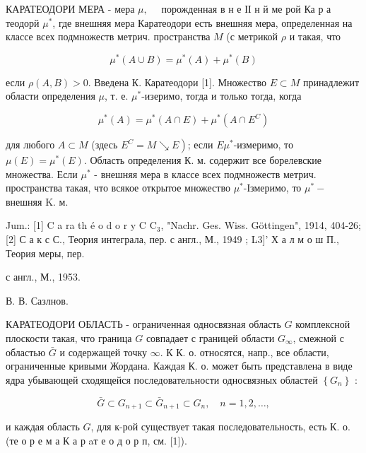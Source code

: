 \documentclass[10pt]{article}
\begin{document}
КАРАТЕОДОРИ МЕРА - мера $\mu, \quad$ порожденная в н е ІІ н й ме рой Ка р а теодорй $\mu^{*}$, где внешняя мера Каратеодори есть внешняя мера, определенная на классе всех подмножеств метрич. пространства $M$ (с метрикой $\rho$ и такая, что



\[

\mu^{*}(A \cup B)=\mu^{*}(A)+\mu^{*}(B)

\]



если $\rho(A, B)>0$. Введена К. Каратеодори [1]. Множество $E \subset M$ принадлежит области определения $\mu$, т. е. $\mu^{*}$-изеримо, тогда и только тогда, когда



\[

\mu^{*}(A)=\mu^{*}(A \cap E)+\mu^{*}\left(A \cap E^{C}\right)

\]



для любого $A \subset M$ (здесь $\left.E^{C}=M \searrow E\right)$; если $E \mu^{*}$-измеримо, то $\mu(E)=\mu^{*}(E)$. Область определения К. м. содержит все борелевские множества. Если $\mu^{*}$ - внешняя мера в классе всех подмножеств метрич. пространства такая, что всякое открытое множество $\mu^{*}$-Ізмеримо, то $\mu^{*}-$ внешняя $\mathrm{K}$. м.



Jum.: [1] C a ra th é o d o r y C $\mathrm{C}_{3}$, "Nachr. Ges. Wiss. Göttingen", 1914, 404-26; [2] С а к с С., Теория интеграла, пер. с англ., М., 1949 ; L3]' Х а л м о ш П., Теория меры, пер.

с англ., М., 1953.

В. В. Сазлнов.



КАРАТЕОДОРИ ОБЛАСТЬ - ограниченная односвязная область $G$ комплексной плоскости такая, что граница $G$ совпадает с границей области $G_{\infty}$, смежной с областью $\bar{G}$ и содержащей точку $\infty$. К К. о. относятся, напр., все области, ограниченные кривыми Жордана. Каждая К. о. может быть представлена в виде ядра убывающей сходящейся последовательности односвязных областей $\left\{G_{n}\right\}$ :



\[

\bar{G} \subset G_{n+1} \subset \bar{G}_{n+1} \subset G_{n}, \quad n=1,2, \ldots,

\]



и каждая область $G$, для к-рой существует такая последовательность, есть К. о. (те о р е м а К а р aт е о д о р п, см. [1]).
\end{document}
